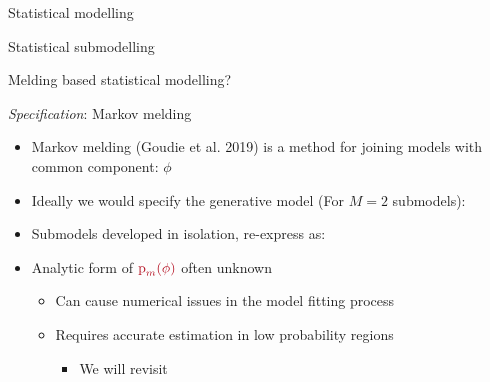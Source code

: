 \documentclass[10pt,ignorenonframetext,]{beamer}
\providecommand{\tightlist}{%
  \setlength{\itemsep}{0pt}\setlength{\parskip}{0pt}}
\newcommand{\pd}{\text{p}}
\newcommand{\modelindex}{m}
\begin{document}
\begin{frame}{Statistical modelling}



\end{frame}

\begin{frame}{Statistical submodelling}



\end{frame}

\begin{frame}{Melding based statistical modelling?}



\end{frame}

\begin{frame}{\emph{Specification}: Markov melding}

\begin{itemize}
\tightlist
\item
  Markov melding (Goudie et al. 2019) is a method for joining models
  with common component: \(\phi\)
\item
  Ideally we would specify the generative model (For \(M = 2\)
  submodels): 
\item
  Submodels developed in isolation, re-express as:
  
\item
  Analytic form of
  \(\textcolor{myredhighlight}{\pd_{\modelindex}(\phi)}\) often unknown

  \begin{itemize}
  \tightlist
  \item
    Can cause numerical issues in the model fitting process
  \item
    Requires accurate estimation in low probability regions

    \begin{itemize}
    \tightlist
    \item
      We will revisit
    \end{itemize}
  \end{itemize}
\end{itemize}

\end{frame}
\end{document}
